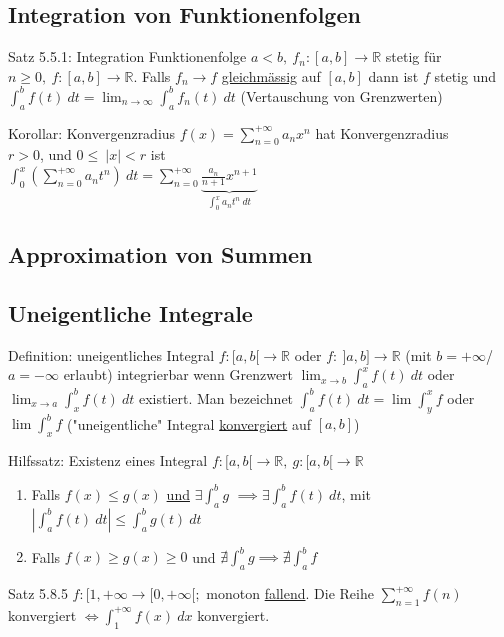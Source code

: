 \documentclass[a4paper,10pt]{article}
\begin{document}
\subsection{Integration von Funktionenfolgen}
\begin{tbox}
    {Satz 5.5.1:  Integration Funktionenfolge}
    $a<b,\ f_n:[a,b]\longrightarrow\mathbb R$ stetig für $n\ge 0,\ f:[a,b]\longrightarrow \mathbb R$. Falls $f_n\longrightarrow f$ \underline{gleichmässig} auf $[a,b]$ dann ist $f$ stetig und $\int_a^b f(t)\ dt=\lim_{n\to\infty}\int_a^b f_n(t)\ dt$ (Vertauschung von Grenzwerten)
\end{tbox}
\begin{tbox}
    {Korollar: Konvergenzradius}
    $f(x)=\sum_{n=0}^{+\infty}a_nx^n$ hat Konvergenzradius 
    \\ $r>0$, und $0\le\ |x|<r$ ist 
    \\ $\int_0^x(\sum_{n=0}^{+\infty}a_nt^n)\ dt = \sum_{n=0}^{+\infty}\underbrace{\frac {a_n}{n+1}x^{n+1}}_{\int_0^xa_nt^n\ dt}$
\end{tbox}
\subsection{Approximation von Summen}
\subsection{Uneigentliche Integrale}
\begin{defbox}
    {Definition: uneigentliches Integral}
    $f:[a,b[\longrightarrow\mathbb R$ oder $f:\ ]a,b]\longrightarrow\mathbb R$ (mit $b=+\infty$/$a=-\infty$ erlaubt) integrierbar wenn Grenzwert $\lim_{x\to b}\int_a^x f(t)\ dt$ oder $\lim_{x\to a}\int_x^b f(t)\ dt$ existiert.
    Man bezeichnet $\int_a^b f(t)\ dt =\lim \int_y^x f$ oder $\lim\int_x^b f$ ("uneigentliche" Integral \underline{konvergiert} auf $[a,b]$)
\end{defbox}
\begin{tbox}
    {Hilfssatz: Existenz eines Integral}
    $f:[a,b[\longrightarrow\mathbb R,\ g:[a,b[\longrightarrow\mathbb R$
    \begin{enumerate}
        \item Falls $f(x)\le g(x)$ \underline{und} $\exists \int_a^b g$ $\implies \exists\int_a^b f(t)\ dt$, mit $|\int_a^b f(t)\ dt|\le \int_a^b g(t)\ dt$
        \item Falls $f(x)\ge g(x)\ge 0$ und $\nexists \int_a^b g \implies \nexists \int_a^b f$
    \end{enumerate}
\end{tbox}
\begin{tbox}
    {Satz 5.8.5}
    $f:[1,+\infty\longrightarrow[0,+\infty[;$ monoton \underline{fallend}. Die Reihe $\sum_{n=1}^{+\infty} f(n)$ konvergiert $\iff \int_1^{+\infty} f(x)\ dx$ konvergiert.
\end{tbox}
\end{document}
